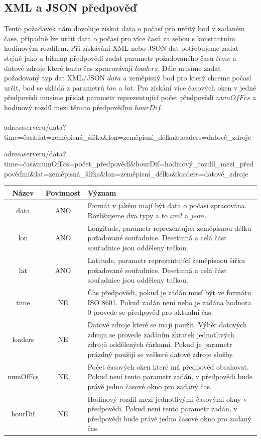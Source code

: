\documentclass[czech,bachelor,dept460,male,csharp,cpdeclaration]{diploma}
\begin{document}
	\subsection{XML a JSON předpověď}
	
	Tento požadavek nám dovoluje získat data o počasí pro určitý bod v zadaném čase, případně lze určit data o počasí pro více časů za sebou s konstantním hodinovým rozdílem. Při získávání XML nebo JSON dat potřebujeme zadat stejně jako u bitmap předpovědí zadat parametr požadovaného času $time$ a datové zdroje které tento čas zpracovávají $loaders$. Dále musíme zadat požadovaný typ dat XML/JSON $data$ a zeměpisný bod pro který chceme počasí určit, bod se skládá z parametrů $lon$ a $lat$. Pro získání více časových oken v jedné předpovědi musíme přidat parametr reprezentující počet předpovědí $numOfFcs$ a hodinový rozdíl mezi těmito předpověďmi $hourDif$.
	\\\\
	adresaserveru/{data}?time={čas}\&lat={zeměpisná\_šířka}\&lon={zeměpisní\_délka}\&loaders={datové\_zdroje}
	
	adresaserveru/{data}?time={čas}\&numOfFcs={počet\_předpovědí}\&hourDif={hodinový\_rozdíl\_mezi\_předpověďmi}\&lat={zeměpisná\_šířka}\&lon={zeměpisní\_délka}\&loaders={datové\_zdroje}
	
	\begin{center}
		\begin{tabular}{c c p{13cm}}
			Název & Povinnost & Význam \\
			\midrule
			data & ANO & Formát v jakém mají být data o počasí zpracována. Rozlišujeme dva typy a to $xml$ a $json$.\\
			lon & ANO & Longitude, parametr reprezentující zeměpisnou délku požadované souřadnice. Desetinná a celá část souřadnice jsou odděleny tečkou.\\
			lat & ANO & Latitude, parametr reprezentující zeměpisnou šířku požadované souřadnice. Desetinná a celá část souřadnice jsou odděleny tečkou.\\
			time & NE & Čas předpovědi, pokud je zadán musí být ve formátu ISO 8601. Pokud zadán není nebo je zadána hodnota 0  provede se předpověď pro aktuální čas.\\ 
			loaders & NE & Datové zdroje které se mají použít. Výběr datových zdroju se provede zadáním zkratek jednotlivých zdrojů oddělených čárkami. Pokud je parametr prázdný použijí se veškeré datové zdroje služby. \\
			numOfFcs & NE & Počet časových oken které má předpověď obsahovat. Pokud není tento parametr zadán, v předpovědi bude právě jedno časové okno pro zadaný čas.\\
			hourDif & NE & Hodinový rozdíl mezi jednotlivými časovými okny v předpovědi. Pokud není tento parametr zadán, v předpovědi bude právě jedno časové okno pro zadaný čas.\\
		\end{tabular}
	\end{center}
\end{document}
